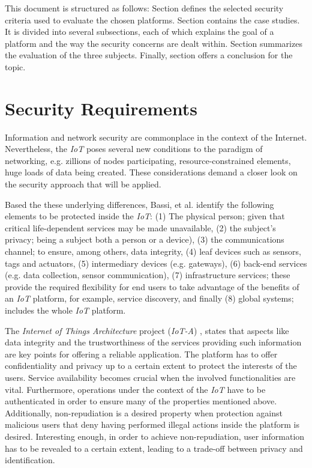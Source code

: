 \documentclass[journal]{IEEEtran}
\begin{document}
  This document is structured as follows: Section \uppercase\expandafter{} defines the selected security criteria used to evaluate the chosen platforms. Section \uppercase\expandafter{} contains the case studies. It is divided into several subsections, each of which explains the goal of a platform and the way the security concerns are dealt within. Section \uppercase\expandafter{} summarizes the evaluation of the three subjects. Finally, section \uppercase\expandafter{} offers a conclusion for the topic.

\section{Security Requirements} \label{sec_security_requirements}
  Information and network security are commonplace in the context of the Internet. Nevertheless, the \emph{IoT} poses several new conditions to the paradigm of networking, e.g. zillions of nodes participating, resource-constrained elements, huge loads of data being created. These considerations demand a closer look on the security approach that will be applied.

  Based the these underlying differences, Bassi, et al. \cite{Bassi2013} identify the following elements to be protected inside the \emph{IoT}: (1) The physical person; given that critical life-dependent services may be made unavailable, (2) the subject's privacy; being a subject both a person or a device), (3) the communications channel; to ensure, among others, data integrity, (4) leaf devices such as sensors, tags and actuators, (5) intermediary devices (e.g. gateways), (6) back-end services (e.g. data collection, sensor communication), (7) infrastructure services; these provide the required flexibility for end users to take advantage of the benefits of an \emph{IoT} platform, for example, service discovery, and finally (8) global systems; includes the whole \emph{IoT} platform.

  The \emph{Internet of Things Architecture} project (\emph{IoT-A}) \cite{Salinas2013}, states that aspects like data integrity and the trustworthiness of the services providing such information are key points for offering a reliable application. The platform has to offer confidentiality and privacy up to a certain extent to protect the interests of the users. Service availability becomes crucial when the involved functionalities are vital. Furthermore, operations under the context of the \emph{IoT} have to be authenticated in order to ensure many of the properties mentioned above. Additionally, non-repudiation is a desired property when protection against malicious users that deny having performed illegal actions inside the platform is desired. Interesting enough, in order to achieve non-repudiation, user information has to be revealed to a certain extent, leading to a trade-off between privacy and identification.
\end{document}
